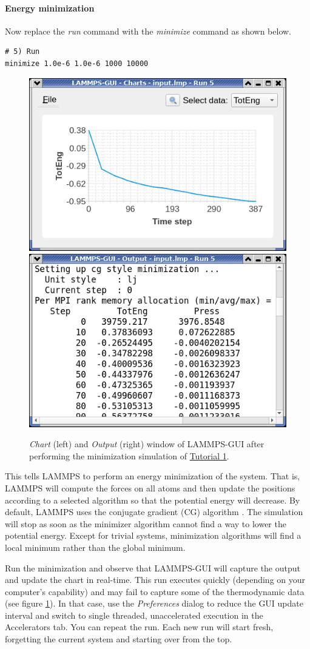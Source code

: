 \documentclass[9pt,tutorial]{livecoms}
\begin{document}
\paragraph{Energy minimization}
Now replace the \textit{run} command with the \textit{minimize} command
as shown below.
\begin{lstlisting}
# 5) Run
minimize 1.0e-6 1.0e-6 1000 10000
\end{lstlisting}

\begin{figure}
\centering
\includegraphics[width=0.45\linewidth]{chart-1}
\includegraphics[width=0.45\linewidth]{output-1}
\caption{\textit{Chart} (left) and \textit{Output} (right) window of LAMMPS-GUI after performing
  the minimization simulation of \hyperref[lennard-jones-label]{Tutorial 1}.}
\label{fig:chart-log}
\end{figure}

This tells LAMMPS to perform an energy minimization of the system.  That
is, LAMMPS will compute the forces on all atoms and then update the
positions according to a selected algorithm so that the potential energy
will decrease.  By default, LAMMPS uses the conjugate gradient (CG)
algorithm \cite{hestenes1952methods}.  The simulation will stop as soon
as the minimizer algorithm cannot find a way to lower the potential
energy.  Except for trivial systems, minimization algorithms will find
a local minimum rather than the global minimum.

Run the minimization and observe that LAMMPS-GUI will capture the output
and update the chart in real-time.  This run executes quickly (depending on
your computer's capability) and may fail to
capture some of the thermodynamic data (see figure \ref{fig:chart-log}).
In that case, use the \textit{Preferences} dialog to reduce the
GUI update interval and switch to single threaded, unaccelerated
execution in the Accelerators tab.  You can repeat the run.  Each new run
will start fresh, forgetting the current system and starting over from the top.
\end{document}
